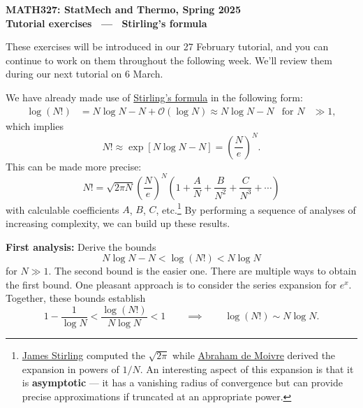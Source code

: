 \documentclass[12 pt]{article} %
\newcommand{\cO}{\ensuremath{\mathcal O} }
\begin{document}
\newcommand{\thisunit}{MATH327 Tutorial (Stirling)}
\newcommand{\moddate}{Last modified 27 Feb.~2025}
\begin{center}
  {\Large \textbf{MATH327: StatMech and Thermo, Spring 2025}} \\[12 pt]
  {\Large \textbf{Tutorial exercises \ --- \ Stirling's formula}} \\[24 pt]
\end{center}

These exercises will be introduced in our 27 February tutorial, and you can continue to work on them throughout the following week.
We'll review them during our next tutorial on 6 March.

We have already made use of \href{https://en.wikipedia.org/wiki/Stirling's_approximation}{Stirling's formula} in the following form:
\begin{align*}
  \log(N!) & = N \log N - N + \cO(\log N) \approx N \log N - N &
  \mbox{for } N & \gg 1,
\end{align*}
which implies
\begin{equation*}
  N! \approx \exp\left[N\log N - N\right] = \left(\frac{N}{e}\right)^N.
\end{equation*}
This can be made more precise:
\begin{equation}
  \label{eq:full}
  N! = \sqrt{2\pi N} \left(\frac{N}{e}\right)^N \left(1 + \frac{A}{N} + \frac{B}{N^2} + \frac{C}{N^3} + \cdots\right)
\end{equation}
with calculable coefficients $A$, $B$, $C$, etc.\footnote{\href{https://en.wikipedia.org/wiki/James_Stirling_(mathematician)}{James Stirling} computed the $\sqrt{2\pi}$ while \href{https://en.wikipedia.org/wiki/Abraham_de_Moivre}{Abraham de Moivre} derived the expansion in powers of $1 / N$.  An interesting aspect of this expansion is that it is \textbf{asymptotic} --- it has a vanishing radius of convergence but can provide precise approximations if truncated at an appropriate power.}
By performing a sequence of analyses of increasing complexity, we can build up these results.

\textbf{First analysis:} Derive the bounds
\begin{equation}
  N\log N - N < \log(N!) < N\log N
\end{equation}
for $N \gg 1$.
The second bound is the easier one.
There are multiple ways to obtain the first bound.
One pleasant approach is to consider the series expansion for $e^x$.
Together, these bounds establish
\begin{equation*}
  1 - \frac{1}{\log N} < \frac{\log(N!)}{N\log N} < 1 \qquad \implies \qquad \log(N!) \sim N\log N.
\end{equation*}
\end{document}
